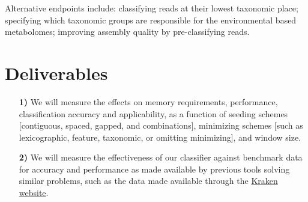 \documentclass{elsarticle}
\begin{document}
Alternative endpoints include: classifying reads at their lowest
taxonomic place; specifying which taxonomic groups are responsible for
the environmental based metabolomes; improving assembly quality by
pre-classifying reads.

\section*{Deliverables}
%
\begin{enumerate}
%
\item[\textbf{1)}] We will measure the effects on memory requirements,
performance, classification accuracy and applicability, as a function
of seeding schemes [contiguous, spaced, gapped, and combinations],
minimizing schemes [such as lexicographic, feature, taxonomic, or
omitting minimizing], and window size.
%
\item[\textbf{2)}] We will measure the effectiveness of our classifier
against benchmark data for accuracy and performance as made available
by previous tools solving similar problems, such as the data made
available through the
\href{https://ccb.jhu.edu/software/kraken/}{Kraken website}.
%
\end{enumerate}




\end{document}

